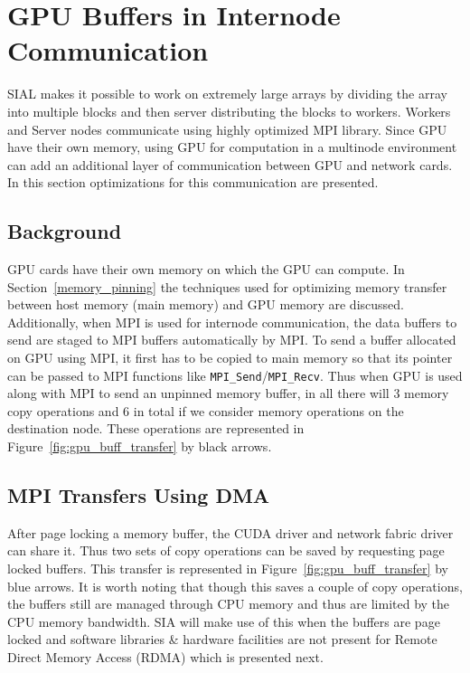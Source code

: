 \section{GPU Buffers in Internode Communication}
SIAL makes it possible to work on extremely large arrays by dividing the array into
multiple blocks and then server distributing the blocks to workers. Workers and
Server nodes communicate using highly optimized MPI library. Since GPU have their
own memory, using GPU for computation in a multinode environment can add an
additional layer of communication between GPU and network cards. In this section
optimizations for this communication are presented.

\subsection{Background}
GPU cards have their own memory on which the GPU can compute. In
Section~\ref{memory_pinning} the techniques used for optimizing memory transfer
between host memory (main memory) and GPU memory are discussed. Additionally, when
MPI is used for internode communication, the data buffers to send are staged
to MPI buffers automatically by MPI. To send a buffer allocated on GPU using MPI,
it first has to be copied to main memory so that its pointer can be passed to
MPI functions like \texttt{MPI\_Send}/\texttt{MPI\_Recv}. Thus when GPU is used
along with MPI to send an unpinned memory buffer, in all there will 3 memory copy
operations and 6 in total if we consider memory operations on the destination node.
These operations are represented in Figure~\ref{fig:gpu_buff_transfer} by black arrows.

\subsection{MPI Transfers Using DMA}
After page locking a memory buffer, the CUDA driver and network fabric driver can
share it. Thus two sets of copy operations can be saved by requesting page locked
buffers. This transfer is represented in Figure~\ref{fig:gpu_buff_transfer} by blue
arrows. It is worth noting that though this saves a couple of copy operations, the
buffers still are managed through CPU memory and thus are limited by the CPU
memory bandwidth. SIA will make use of this when the buffers are page locked and
software libraries \& hardware facilities are not present for Remote Direct Memory
Access (RDMA) which is
presented next.

